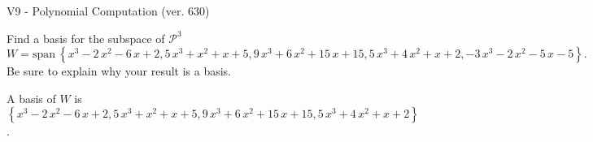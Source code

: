 \begin{exercise}
  \begin{exerciseTitle}V9 - Polynomial Computation (ver. 630)\end{exerciseTitle}
  \begin{exerciseStatement}
    Find a basis for the subspace of \(\mathcal{P}^3\) 
\[W=\mathrm{span}\ \left\{x^{3} - 2 \, x^{2} - 6 \, x + 2 , 5 \, x^{3} + x^{2} + x + 5 , 9 \, x^{3} + 6 \, x^{2} + 15 \, x + 15 , 5 \, x^{3} + 4 \, x^{2} + x + 2 , -3 \, x^{3} - 2 \, x^{2} - 5 \, x - 5\right\}.\]
 Be sure to explain why your result is a basis.


  \end{exerciseStatement}
  \begin{exerciseAnswer}
   A basis of \(W\) is  \(\left\{x^{3} - 2 \, x^{2} - 6 \, x + 2 , 5 \, x^{3} + x^{2} + x + 5 , 9 \, x^{3} + 6 \, x^{2} + 15 \, x + 15 , 5 \, x^{3} + 4 \, x^{2} + x + 2\right\}\).
  


  \end{exerciseAnswer}
\end{exercise}